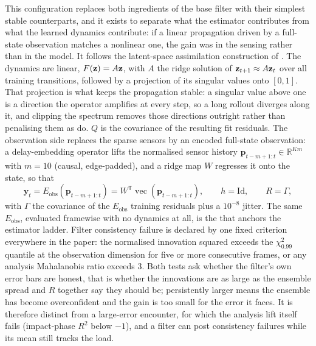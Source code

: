 This configuration replaces both ingredients of the base filter with their
simplest stable counterparts, and it exists to separate what the estimator
contributes from what the learned dynamics contribute: if a linear propagation
driven by a full-state observation matches a nonlinear one, the gain was in the
sensing rather than in the model. It follows the latent-space assimilation
construction of \citet{tong2026}. The dynamics are linear, $F(\mathbf{z}) = A\mathbf{z}$,
with $A$ the ridge solution of $\mathbf{z}_{t+1} \approx A \mathbf{z}_t$ over all training
transitions, followed by a projection of its singular values onto $[0, 1]$. That
projection is what keeps the propagation stable: a singular value above one is a
direction the operator amplifies at every step, so a long rollout diverges along
it, and clipping the spectrum removes those directions outright rather than
penalising them as \citet{tong2026} do. $Q$ is the covariance of the resulting
fit residuals. The observation side replaces the sparse sensors by an encoded
full-state observation: a delay-embedding operator lifts the normalised sensor
history $\mathbf{p}_{t-m+1:t} \in \mathbb{R}^{Km}$ with $m = 10$ (causal,
edge-padded), and a ridge map $W$ regresses it onto the state, so that
\begin{equation}
  \mathbf{y}_t = E_{\mathrm{obs}}\!\left(\mathbf{p}_{t-m+1:t}\right)
  = W^{\mathsf{T}} \operatorname{vec}\!\left(\mathbf{p}_{t-m+1:t}\right),
  \qquad h = \mathrm{Id}, \qquad
  R = \Gamma,
  \label{eq:eobs}
\end{equation}
with $\Gamma$ the covariance of the $E_{\mathrm{obs}}$ training residuals
plus a $10^{-8}$ jitter. The same $E_{\mathrm{obs}}$, evaluated framewise
with no dynamics at all, is the \StaticInv{} that anchors the estimator
ladder. Filter consistency failure is declared by one fixed criterion everywhere
in the paper: the normalised innovation squared exceeds the $\chi^2_{0.99}$
quantile at the observation dimension for five or more consecutive frames, or
any analysis Mahalanobis ratio exceeds $3$. Both tests ask whether the filter's
own error bars are honest, that is whether the innovations are as large as the
ensemble spread and $R$ together say they should be; persistently larger means
the ensemble has become overconfident and the gain is too small for the error it
faces. It is therefore distinct from a large-error encounter, for which the
analysis lift itself fails (impact-phase $R^2$ below $-1$), and a filter can
post consistency failures while its mean still tracks the load.\re

